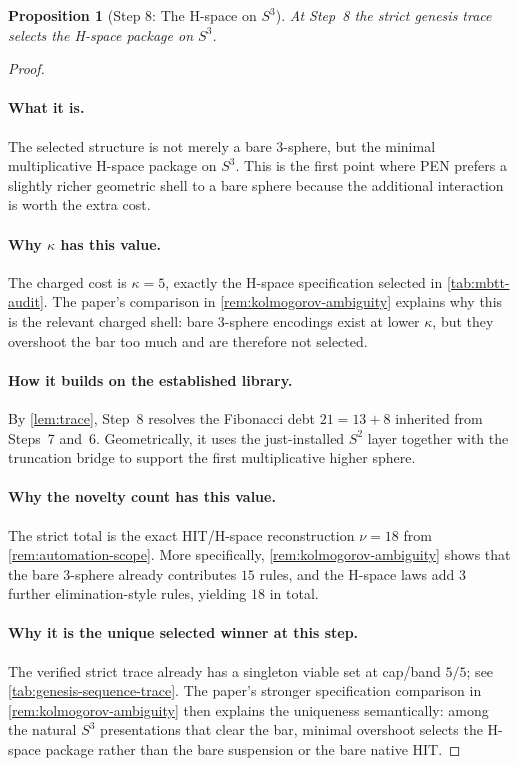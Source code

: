 \documentclass[11pt,a4paper]{article}
\theoremstyle{plain}
\newtheorem{proposition}[theorem]{Proposition}
\theoremstyle{definition}
\theoremstyle{remark}
\begin{document}
\begin{proposition}[Step 8: The H-space on $S^3$]
\label{prop:genesis-step8}
At Step~8 the strict genesis trace selects the H-space package on $S^3$.
\end{proposition}

\begin{proof}
\paragraph{What it is.}
The selected structure is not merely a bare 3-sphere, but the minimal
multiplicative H-space package on $S^3$.
This is the first point where PEN prefers a slightly richer geometric shell to a
bare sphere because the additional interaction is worth the extra cost.

\paragraph{Why $\kappa$ has this value.}
The charged cost is $\kappa=5$, exactly the H-space specification selected in
\cref{tab:mbtt-audit}.
The paper's comparison in \cref{rem:kolmogorov-ambiguity} explains why this is
the relevant charged shell: bare 3-sphere encodings exist at lower $\kappa$, but
they overshoot the bar too much and are therefore not selected.

\paragraph{How it builds on the established library.}
By \cref{lem:trace}, Step~8 resolves the Fibonacci debt
$21=13+8$ inherited from Steps~7 and~6.
Geometrically, it uses the just-installed $S^2$ layer together with the
truncation bridge to support the first multiplicative higher sphere.

\paragraph{Why the novelty count has this value.}
The strict total is the exact HIT/H-space reconstruction $\nu=18$ from
\cref{rem:automation-scope}.
More specifically, \cref{rem:kolmogorov-ambiguity} shows that the bare 3-sphere
already contributes $15$ rules, and the H-space laws add $3$ further
elimination-style rules, yielding $18$ in total.

\paragraph{Why it is the unique selected winner at this step.}
The verified strict trace already has a singleton viable set at cap/band $5/5$;
see \cref{tab:genesis-sequence-trace}.
The paper's stronger specification comparison in
\cref{rem:kolmogorov-ambiguity} then explains the uniqueness semantically:
among the natural $S^3$ presentations that clear the bar, minimal overshoot
selects the H-space package rather than the bare suspension or the bare native
HIT.
\end{proof}
\end{document}
